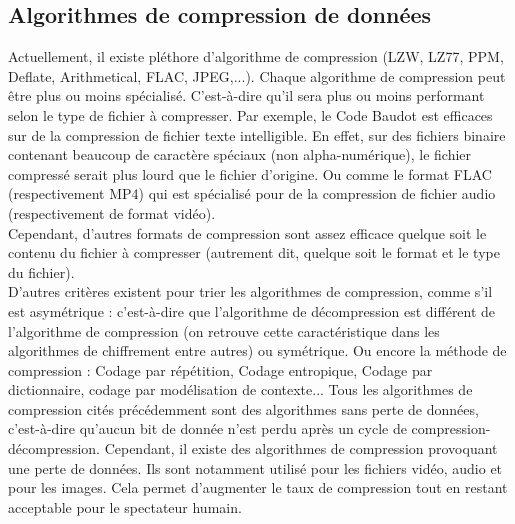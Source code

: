     \subsection{Algorithmes de compression de données}
        Actuellement, il existe pléthore d'algorithme de compression (LZW, LZ77, PPM, Deflate, Arithmetical, FLAC, JPEG,...). Chaque algorithme de compression peut être plus ou moins spécialisé. C'est-à-dire qu'il sera plus ou moins performant selon le type de fichier à compresser. Par exemple, le Code Baudot est efficaces sur de la compression de fichier texte intelligible. En effet, sur des fichiers binaire contenant beaucoup de caractère spéciaux (non alpha-numérique), le fichier compressé serait plus lourd que le fichier d'origine. Ou comme le format FLAC (respectivement MP4) qui est spécialisé pour de la compression de fichier audio (respectivement de format vidéo). \\
        Cependant, d'autres formats de compression sont assez efficace quelque soit le contenu du fichier à compresser (autrement dit, quelque soit le format et le type du fichier). \\
        D'autres critères existent pour trier les algorithmes de compression, comme s'il est asymétrique : c'est-à-dire que l'algorithme de décompression est différent de l'algorithme de compression (on retrouve cette caractéristique dans les algorithmes de chiffrement entre autres) ou symétrique. Ou encore la méthode de compression : Codage par répétition, Codage entropique, Codage par dictionnaire, codage par modélisation de contexte... Tous les algorithmes de compression cités précédemment sont des algorithmes sans perte de données, c'est-à-dire qu'aucun bit de donnée n'est perdu après un cycle de compression-décompression. Cependant, il existe des algorithmes de compression provoquant une perte de données. Ils sont notamment utilisé pour les fichiers vidéo, audio et pour les images. Cela permet d'augmenter le taux de compression tout en restant acceptable pour le spectateur humain.
        
